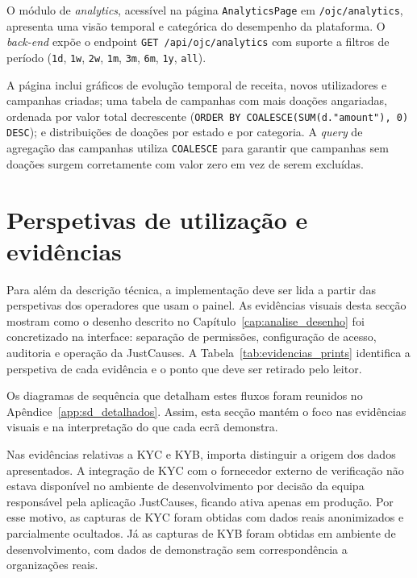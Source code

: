 O módulo de \textit{analytics}, acessível na página \texttt{AnalyticsPage} em \texttt{/ojc/analytics}, apresenta uma visão temporal e categórica do desempenho da plataforma. O \textit{back-end} expõe o endpoint \texttt{GET /api/ojc/analytics} com suporte a filtros de período (\texttt{1d}, \texttt{1w}, \texttt{2w}, \texttt{1m}, \texttt{3m}, \texttt{6m}, \texttt{1y}, \texttt{all}).

A página inclui gráficos de evolução temporal de receita, novos utilizadores e campanhas criadas; uma tabela de campanhas com mais doações angariadas, ordenada por valor total decrescente (\texttt{ORDER BY COALESCE(SUM(d."amount"), 0) DESC}); e distribuições de doações por estado e por categoria. A \textit{query} de agregação das campanhas utiliza \texttt{COALESCE} para garantir que campanhas sem doações surgem corretamente com valor zero em vez de serem excluídas.


\section{Perspetivas de utilização e evidências}
\label{sec:evidencias_utilizador}

Para além da descrição técnica, a implementação deve ser lida a partir das perspetivas dos operadores que usam o painel. As evidências visuais desta secção mostram como o desenho descrito no Capítulo~\ref{cap:analise_desenho} foi concretizado na interface: separação de permissões, configuração de acesso, auditoria e operação da JustCauses. A Tabela~\ref{tab:evidencias_prints} identifica a perspetiva de cada evidência e o ponto que deve ser retirado pelo leitor.

Os diagramas de sequência que detalham estes fluxos foram reunidos no Apêndice~\ref{app:sd_detalhados}. Assim, esta secção mantém o foco nas evidências visuais e na interpretação do que cada ecrã demonstra.

Nas evidências relativas a \gls{KYC} e \gls{KYB}, importa distinguir a origem dos dados apresentados. A integração de \gls{KYC} com o fornecedor externo de verificação não estava disponível no ambiente de desenvolvimento por decisão da equipa responsável pela aplicação JustCauses, ficando ativa apenas em produção. Por esse motivo, as capturas de \gls{KYC} foram obtidas com dados reais anonimizados e parcialmente ocultados. Já as capturas de \gls{KYB} foram obtidas em ambiente de desenvolvimento, com dados de demonstração sem correspondência a organizações reais.

